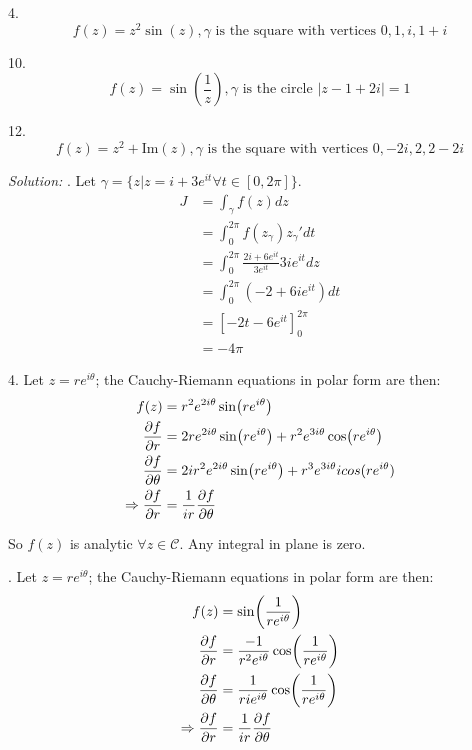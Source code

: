 \documentclass[11pt]{homework}
\begin{document}
4.
\begin{equation*}
  f(z) = z^2 \sin(z), \gamma \text{ is the square with vertices } 0,1,i,1+i
\end{equation*} 

10.
\begin{equation*}
  f(z) = \sin(\frac{1}{z}), \gamma \text{ is the circle } |z-1+2i|=1
\end{equation*} 

12.
\begin{equation*}
  f(z) = z^2 + \text{Im}(z), \gamma \text{ is the square with vertices } 0, -2i, 2, 2-2i
\end{equation*} 

\emph{Solution:}
. Let $\gamma = \{z | z = i + 3 e^{it} \forall t\in[0,2\pi]\}$.
\begin{align*}
  J &= \int_\gamma f(z) dz \\
    &= \int_0^{2\pi} f(z_\gamma) z_\gamma' dt  \\
    &= \int_0^{2\pi} \frac{ 2i + 6e^{it}}{3e^{it}} 3ie^{it} dz \\
    &= \int_0^{2\pi} (-2 + 6i e^{it}) dt \\
    &= \left[-2t - 6e^{it}\right]_0^{2\pi} \\
    &= -4 \pi
\end{align*}

4. Let $z=re^{i\theta}$; the Cauchy-Riemann equations in polar form are then:
\begin{align*}
f(z)            &= r^2 e^{2i \theta } \sin ( r e^{i\theta}) \\
\pdv{f}{r}      &= 2 r e^{2i\theta}\sin(r e^{i\theta}) + r^2 e^{3i\theta} \cos(re^{i\theta}) \\
\pdv{f}{\theta} &= 2ir^2 e^{2i\theta} \sin(r e^{i\theta}) + r^3 e^{3i\theta} i cos(r e^{i\theta}) \\
\Rightarrow
  \pdv{f}{r} &= \frac{1}{ir} \pdv{f}{\theta} 
\end{align*}

So $f(z)$ is analytic $\forall z\in \mathcal{C}$. Any integral in plane is zero.

. Let $z=re^{i\theta}$; the Cauchy-Riemann equations in polar form are then:
\begin{align*}
f(z) &= \sin( \frac{1}{re^{i\theta}}) \\
\pdv{f}{r} &= \frac{-1}{r^2e^{i\theta}} \cos( \frac{1}{re^{i\theta}}) \\
\pdv{f}{\theta} &= \frac{1}{rie^{i\theta}} \cos( \frac{1}{re^{i\theta}}) \\
\Rightarrow
  \pdv{f}{r} &= \frac{1}{ir} \pdv{f}{\theta} 
\end{align*}
\end{document}
